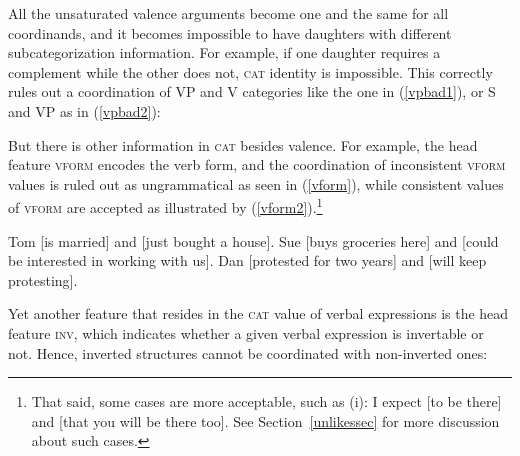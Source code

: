\largerpage
All the unsaturated valence arguments become one and the same for all coordinands, and it becomes impossible to have daughters with different subcategorization information. For example, if one daughter requires a complement while the other does not,
\textsc{cat} identity  is impossible. This correctly rules out  a coordination of  VP and V categories
like the one in (\ref{vpbad1}), or S and VP as in (\ref{vpbad2}):

\eal
{}\label{vpbad1}
\label{vpbad2}
\zl

\noindent
But there is other information in \textsc{cat} besides valence. For example, the head feature
\textsc{vform} encodes the verb form, and the coordination of inconsistent \textsc{vform} values is
ruled out as ungrammatical as seen in (\ref{vform}), while consistent values of \textsc{vform} are
accepted as illustrated by (\ref{vform2}).\footnote{%
That said, some cases are more acceptable, such as (i):
\ea
I expect [to be there] and [that you will be there too].
\z
See Section~\ref{unlikessec} for more discussion about such cases.}


\eal
\label{vform}
\zl



\ealnoraggedright
\label{vform2}
\ex Tom [is married] and [just bought  a house].
\ex Sue [buys groceries here] and [could be interested in working with us].
\ex Dan [protested for two years] and [will keep protesting].
\zl

Yet another feature that resides in the \textsc{cat} value of verbal expressions is the head feature
\textsc{inv}, which indicates whether a given verbal expression is invertable or not. Hence,
inverted structures cannot be coordinated with non-inverted ones: 


\eal
{}
\zl

